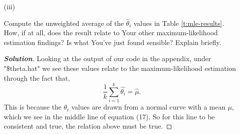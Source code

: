\documentclass[12pt]{article}
\newenvironment{solution}{\begin{tcolorbox}[breakable]\begin{proof}[\textbf{\textit{Solution}}] }{\end{proof}\end{tcolorbox}}
\begin{document}
\begin{itemize}
\begin{itemize}
\begin{solution}
    Like before, this can explained by seeing how we determined $\hat{W_i}^{*}$ which we know from (22) to be calculated by,
    \[\hat{W_i}^{*} = \dfrac{1}{V_i + \hat{\sigma}^{2}}.\]
    So, while it is true that study 6 has the smallest $V_i$, it doesn't change the fact that $\sigma^{2}$ is large, which will make the result of the fraction small. This is because $\sigma^{2}$ represents the between-study heterogeneity, which is high in this meta-analysis, and study 6 actually plays a big role in making it large. 
\end{solution}

\item[(iii)]

Compute the unweighted average of the $\hat{ \theta }_i$ values in Table \ref{t:mle-results}. How, if at all, does the result relate to Your other maximum-likelihood estimation findings? Is what You've just found sensible? Explain briefly. \textit{\fbox{\textbf{[10 points]}}}
\begin{solution}
    Looking at the output of our code in the appendix, under "\$theta.hat" we see these values relate to the maximum-likelihood estimation through the fact that,
    \[\dfrac{1}{k}\sum_{i = 1}^{k}\hat{\theta_i} = \hat{\mu}.\]
    This is because the $\theta_i$ values are drawn from a normal curve with a mean $\mu$, which we see in the middle line of equation (17). So for this line to be consistent and true, the relation above must be true.  
\end{solution}
\end{itemize}

\end{itemize}
\end{document}
